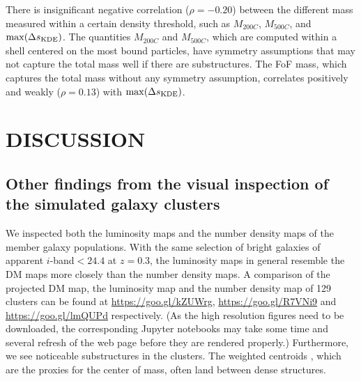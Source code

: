 There is insignificant negative correlation ($\rho = -0.20$) between the different mass 
measured within a certain density threshold, such as $M_{200C}$, $M_{500C}$, 
and $\max(\Delta s_{\rm KDE})$. The quantities $M_{200C}$ and $M_{500C}$, which
are computed within a shell centered on the most bound particles, have
symmetry assumptions that may not capture the total mass well if there are substructures. 
The FoF mass, which
captures the total mass without any symmetry assumption, correlates positively
and weakly 
($\rho = 0.13$) with $\max(\Delta s_{\rm KDE})$. 



% 
 
 
 
\section{DISCUSSION}\label{sec:discussion}

\subsection{Other findings from the visual inspection of the simulated galaxy clusters}
We inspected both the luminosity maps and the
number density maps of the member galaxy populations.
With the same selection of bright galaxies of apparent $i$-band$ < 24.4$ at
$z=0.3$, the luminosity maps in general resemble the DM maps more closely than 
the number density maps.
A comparison of the projected 
DM map, the luminosity map and the number density map of 129 clusters 
can be found at \href{https://goo.gl/kZUWrg}{https://goo.gl/kZUWrg}, 
\href{https://goo.gl/R7VNi9}{https://goo.gl/R7VNi9} and
\href{https://goo.gl/lmQUPd}{https://goo.gl/lmQUPd} respectively. (As
 the high resolution figures need to be downloaded, the 
corresponding Jupyter notebooks may take some time and several refresh of the
web page before they are rendered properly.)
Furthermore, we see noticeable substructures in the clusters. The weighted centroids
, which are the proxies for the center of mass, often land between dense structures.

